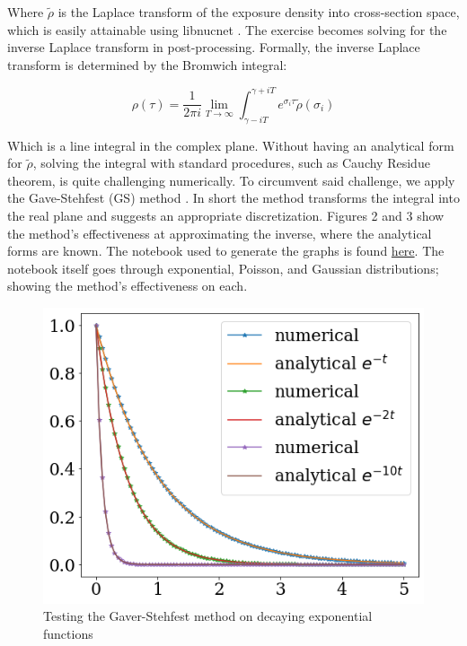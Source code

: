 \documentclass{article}
\begin{document}
Where $\tilde{\rho}$ is the Laplace transform of the exposure density into cross-section space, which is easily attainable using 
libnucnet \cite{meyer}. The exercise becomes solving for the inverse Laplace transform in post-processing. Formally, the inverse 
Laplace transform is determined by the Bromwich integral:

\begin{equation*}
    \rho(\tau) = \frac{1}{2\pi i} \lim_{T\to\infty}\int_{\gamma - iT}^{\gamma + iT}e^{\sigma_{i}\tau}\tilde{\rho}(\sigma_{i})
\end{equation*}

Which is a line integral in the complex plane. Without having an analytical form for $\tilde{\rho}$, solving the integral with standard 
procedures, such as Cauchy Residue theorem, is quite challenging numerically. To circumvent said challenge, we apply the Gave-Stehfest (GS) 
method \cite{jacquot1983gaver}. In short the method transforms the integral into the real plane and suggests an appropriate discretization. 
Figures 2 and 3 show the method's effectiveness at approximating the inverse, where the analytical forms are known. 
The notebook used to generate the graphs is found \href{https://github.com/jaadt7/gaver_stehfest}{here}. The notebook itself goes through 
exponential, Poisson, and Gaussian distributions; showing the method's effectiveness on each.

\begin{figure}[!htp]
    \centerline{\includegraphics[scale = 0.5]{images/exp_test_1.png}}
    \caption{Testing the Gaver-Stehfest method on decaying exponential functions}
\end{figure}
\end{document}
